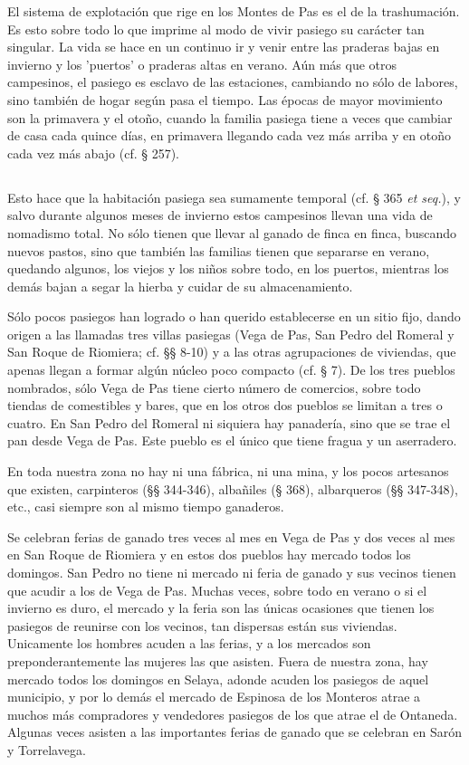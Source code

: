 El sistema de explotación que rige en los Montes de Pas es el de la trashumación. Es esto sobre todo lo que imprime al modo de vivir pasiego su carácter tan singular. La vida se hace en un continuo ir y venir entre las praderas bajas en invierno y los 'puertos' o praderas altas en
verano. Aún más que otros campesinos, el pasiego es esclavo de las estaciones, cambiando no sólo de labores, sino también de hogar según pasa el tiempo. Las épocas de mayor movimiento son la primavera y el otoño, cuando la familia pasiega tiene a veces que cambiar de casa cada quince días, en primavera llegando cada vez más arriba y en otoño cada vez más abajo (cf. § 257).

\subsection{} Esto hace que la habitación pasiega sea sumamente temporal (cf. § 365 \emph{et seq.}), y salvo durante algunos meses de invierno estos campesinos llevan una vida de nomadismo total. No sólo tienen que llevar al ganado de finca en finca, buscando nuevos pastos, sino que también las familias tienen que separarse en verano, quedando algunos, los viejos y los niños sobre todo, en los puertos, mientras los demás bajan a segar la hierba y cuidar de su almacenamiento.

Sólo pocos pasiegos han logrado o han querido establecerse en un sitio fijo, dando origen a las llamadas tres villas pasiegas (Vega de Pas, San Pedro del Romeral y San Roque de Riomiera; cf. §§ 8-10) y a las otras agrupaciones de viviendas, que apenas llegan a formar algún núcleo poco compacto (cf. § 7). De los tres pueblos nombrados, sólo Vega de Pas tiene cierto número de comercios, sobre todo tiendas de comestibles y bares, que en los otros dos pueblos se limitan a tres o cuatro. En San Pedro del Romeral ni siquiera hay panadería, sino que se trae el pan desde Vega de Pas. Este pueblo es el único que tiene fragua y un aserradero.

En toda nuestra zona no hay ni una fábrica, ni una mina, y los pocos artesanos que existen, carpinteros (§§ 344-346), albañiles (§ 368), albarqueros (§§ 347-348), etc., casi siempre son al mismo tiempo ganaderos.

Se celebran ferias de ganado tres veces al mes en Vega de Pas y dos veces al mes en San Roque de Riomiera y en estos dos pueblos hay mercado todos los domingos. San Pedro no tiene ni mercado ni feria de ganado y sus vecinos tienen que acudir a los de Vega de Pas. Muchas veces, sobre todo en verano o si el invierno es duro, el mercado y la feria son las únicas ocasiones que tienen los pasiegos de reunirse con los vecinos, tan dispersas están sus viviendas. Unicamente los hombres acuden a las ferias, y a los mercados son preponderantemente las mujeres las que asisten.
Fuera de nuestra zona, hay mercado todos los domingos en Selaya, adonde acuden los pasiegos de aquel municipio, y por lo demás el mercado de Espinosa de los Monteros atrae a muchos más compradores y vendedores pasiegos de los que atrae el de Ontaneda. Algunas veces asisten a las importantes ferias de ganado que se celebran en Sarón y Torrelavega.


